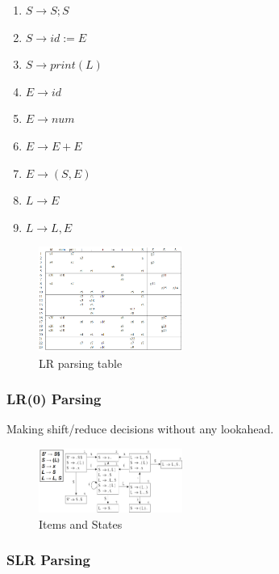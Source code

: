 \begin{example}\quad
    
    \begin{enumerate}
        \item $S\to S;S$
        \item $S\to id:=E$
        \item $S\to print(L)$
        \item $E\to id$
        \item $E\to num$
        \item $E\to E+E$
        \item $E\to (S,E)$
        \item $L\to E$
        \item $L\to L, E$
    \end{enumerate}

    \begin{figure}[!htb]
        \centering
        \includegraphics[width=0.42\textwidth]{pic/CP3/lrtable.png}
        \caption{LR parsing table}
    \end{figure}
    
\end{example}

\subsubsection{LR(0) Parsing}
Making shift/reduce decisions without any lookahead.

\begin{figure}[!htb]
    \centering
    \includegraphics[width=0.42\textwidth]{pic/CP3/LR(0).png}
    \caption{Items and States}
\end{figure}


\subsubsection{SLR Parsing}

